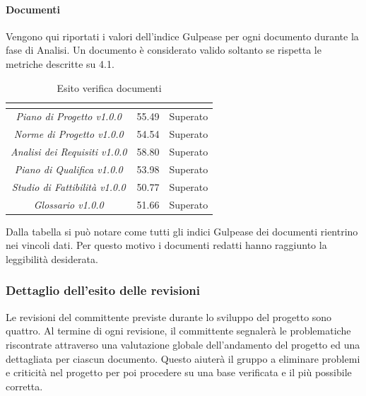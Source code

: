 \paragraph{Documenti} \Spazio
Vengono qui riportati i valori dell'indice Gulpease per ogni documento durante la fase
di Analisi. Un documento è considerato valido soltanto se rispetta le metriche descritte
su 4.1.
\renewcommand{\arraystretch}{1.5}
\begin{table}[H]
\begin{center}
\begin{tabular}{|c|c|c|}
\hline
\rowcolor{title_row}
\textbf{\color{title_text}{Documento}} & \textbf{\color{title_text}{Valore indice}} & \textbf{\color{title_text}{Esito}} \\
\hline
	\emph{Piano di Progetto v1.0.0} & {55.49} & {Superato}\\
\hline
	\emph{Norme di Progetto v1.0.0} & {54.54} & {Superato}\\
\hline
	\emph{Analisi dei Requisiti v1.0.0} & {58.80} & {Superato}\\
\hline
	\emph{Piano di Qualifica v1.0.0} & {53.98} & {Superato}\\
\hline
	\emph{Studio di Fattibilità v1.0.0} & {50.77} & {Superato}\\
\hline
	\emph{Glossario v1.0.0} & {51.66} & {Superato}\\
\hline
\end{tabular}
\caption[Esiti verifica documenti, Analisi]{Esito verifica documenti}
\label{tabella:verifica documenti}
\end{center}
\end{table}
\renewcommand{\arraystretch}{1}

Dalla tabella si può notare come tutti gli indici Gulpease dei documenti rientrino nei vincoli dati. Per questo motivo i documenti redatti hanno raggiunto la leggibilità desiderata.
\subsubsection{Dettaglio dell'esito delle revisioni}
Le revisioni del committente previste durante lo sviluppo del progetto sono quattro.
Al termine di ogni revisione, il committente segnalerà le problematiche riscontrate attraverso una valutazione globale dell'andamento del progetto ed una dettagliata per ciascun documento. 
Questo aiuterà il gruppo a eliminare problemi e criticità nel progetto per poi procedere su una base verificata e il più possibile corretta.
\pagebreak